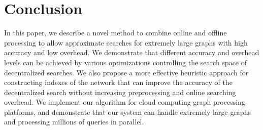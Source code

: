 \section{Conclusion}
\label{conclusion}

In this paper, we describe a novel method to combine online and offline processing to allow approximate searches for extremely large graphs with high accuracy and low overhead. We demonstrate that different accuracy and overhead levels can be achieved by various optimizations controlling the search space of decentralized searches. We also propose a more effective heuristic approach for constructing indexes of the network that can improve the accuracy of the decentralized search without increasing preprocessing and online searching overhead. We implement our algorithm for cloud computing graph processing platforms, and demonstrate that our system can handle extremely large graphs and processing millions of queries in parallel.
